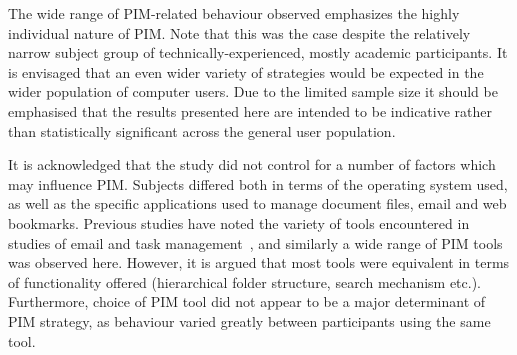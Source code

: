 The wide range of PIM-related behaviour observed emphasizes the highly individual nature of PIM.  Note that this was the case despite the relatively narrow subject group of technically-experienced, mostly academic participants. It is envisaged that an even wider variety of strategies would be expected in the wider population of computer users. Due to the limited sample size it should be emphasised that the results presented here are intended to be indicative rather than statistically significant across the general user population.

It is acknowledged that the study did not control for a number of factors which may influence PIM. Subjects differed both in terms of the operating system used, as well as the specific applications used to manage document files, email and web bookmarks.  Previous studies have noted the variety of tools encountered in studies of email and task management~\citep{Bellotti:00}, and similarly a wide range of PIM tools was observed here.  However, it is argued that most tools were equivalent in terms of functionality offered (hierarchical folder structure, search mechanism etc.). Furthermore, choice of PIM tool did not appear to be a major determinant of PIM strategy, as behaviour varied greatly between  participants using the same tool.  

